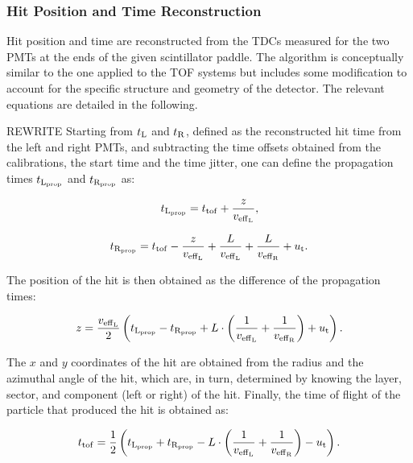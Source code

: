 %
%

\subsubsection{Hit Position and Time Reconstruction}

Hit position and time are reconstructed from the TDCs measured for the two PMTs at the ends of the given scintillator paddle. The algorithm is conceptually similar to the one applied to the TOF systems but includes some modification to account for the specific structure and geometry of the detector. The relevant equations are detailed in the following.

{\color{red} REWRITE Starting from $t_{\rm{L}}$ and $t_{\rm{R}}$, defined as the reconstructed hit time from the left and right PMTs,
and subtracting the time offsets obtained from the calibrations, the start time and the time jitter, one can
define the propagation times $t_{\rm{L}_{\rm{prop}}}$ and $t_{\rm{R}_{\rm{prop}}}$ as:

\begin{equation}
t_{\rm{L}_{\rm{prop}}}=t_{\rm{tof}}+\frac{z}{v_{\rm{eff}_{\rm{L}}}},
\end{equation}

\begin{equation}
t_{\rm{R}_{\rm{prop}}}=t_{\rm{tof}}-\frac{z}{v_{\rm{eff}_{\rm{L}}}}+\frac{L}{v_{\rm{eff}_{\rm{L}}}}
+\frac{L}{v_{\rm{eff}_{\rm{R}}}}+u_{\rm{t}}.
\end{equation}

The position of the hit is then obtained as the difference of the propagation times:

\begin{equation}
z=\frac{v_{\rm{eff}_{\rm{L}}}}{2} \left(t_{\rm{L}_{\rm{prop}}}-t_{\rm{R}_{\rm{prop}}}
+ L \cdot \left(\frac{1}{v_{\rm{eff}_{\rm{L}}}}+\frac{1}{v_{\rm{eff}_{\rm{R}}}}\right)  +u_{\rm{t}}\right).
\end{equation}

The $x$ and $y$ coordinates of the hit are obtained from the radius and the azimuthal angle of the hit, which
are, in turn, determined by knowing the layer, sector, and component (left or right) of the hit.  Finally, the time
of flight of the particle that produced the hit is obtained as:

\begin{equation}
t_{\rm{tof}}= \frac{1}{2}\left(t_{\rm{L}_{\rm{prop}}}+t_{\rm{R}_{\rm{prop}}}- L \cdot \left(\frac{1}{v_{\rm{eff}_{\rm{L}}}}
+\frac{1}{v_{\rm{eff}_{\rm{R}}}}\right)  -u_{\rm{t}}\right).
\end{equation}}

